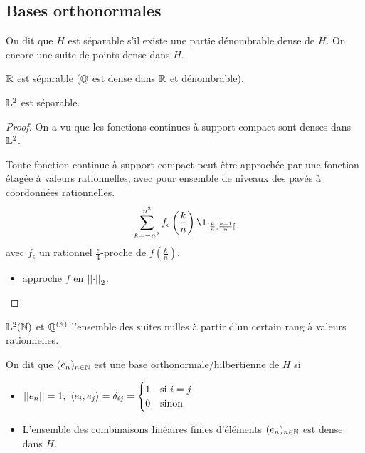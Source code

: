 \subsection{Bases orthonormales}


\begin{definition}
	On dit que $H$ est séparable s'il existe une partie dénombrable dense de $H$. On encore une suite de points dense dans $H$.
\end{definition}


\begin{example}
	$\mathbb{R}$ est séparable ($\mathbb{Q}$ est dense dans $\mathbb{R}$ et dénombrable).
\end{example}

\begin{example}
	$\mathbb{L}^2$ est séparable.
\end{example}

\begin{proof}
	On a vu que les fonctions continues à support compact sont denses dans $\mathbb{L}^2$.


	Toute fonction continue à support compact peut être approchée par une fonction étagée à valeurs rationnelles,
	avec pour ensemble de niveaux des pavés à coordonnées rationnelles.
	$$ \sum_{k=-n^2}^{n^2} f_{\epsilon} \left(\frac k n\right) \1_{[\frac k n, \frac {k+1} n[} $$
	avec $f_{\epsilon}$ un rationnel $\frac {\epsilon} 4$-proche de $f\left(\frac k n\right)$.

	\begin{itemize}
		\item approche $f$ en $\left|\left|\cdot\right|\right|_2$.
	\end{itemize}

\end{proof}

\begin{example}
	$\mathbb{L}^2(\mathbb{N})$ et $\mathbb{Q}^{(\mathbb{N})}$ l'ensemble des suites nulles à partir d'un certain rang à valeurs rationnelles.
\end{example}

\begin{definition}
	On dit que $(e_n)_{n\in \mathbb{N}}$ est une base orthonormale/hilbertienne de $H$ si
	\begin{itemize}
		\item $\left|\left|e_n\right|\right| = 1, \ \left\langle e_i, e_j \right\rangle = \delta_{ij} = \begin{cases} 1 & \text{si } i=j \\ 0 & \text{sinon} \end{cases}$
		\item L'ensemble des combinaisons linéaires finies d'éléments $(e_n)_{n\in \mathbb{N}}$ est dense dans $H$.
	\end{itemize}
\end{definition}


